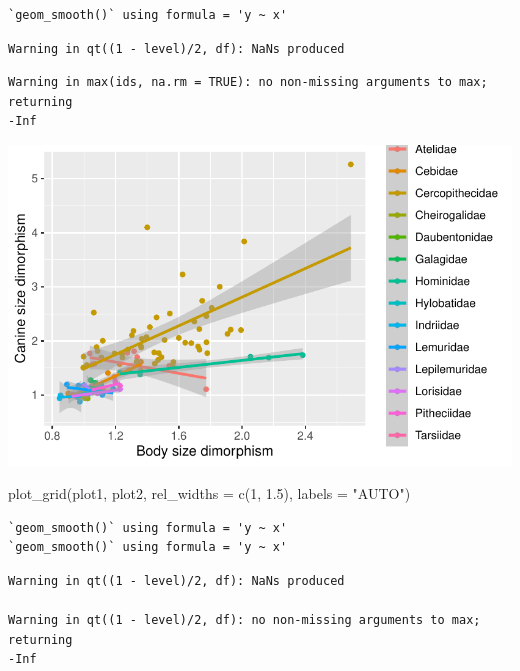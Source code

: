 \documentclass[
  letterpaper,
  DIV=11,
  numbers=noendperiod]{scrartcl}
\newenvironment{Shaded}{\begin{snugshade}}{\end{snugshade}}
\newcommand{\AttributeTok}[1]{\textcolor[rgb]{0.40,0.45,0.13}{#1}}
\newcommand{\DecValTok}[1]{\textcolor[rgb]{0.68,0.00,0.00}{#1}}
\newcommand{\FloatTok}[1]{\textcolor[rgb]{0.68,0.00,0.00}{#1}}
\newcommand{\FunctionTok}[1]{\textcolor[rgb]{0.28,0.35,0.67}{#1}}
\newcommand{\NormalTok}[1]{\textcolor[rgb]{0.00,0.23,0.31}{#1}}
\newcommand{\StringTok}[1]{\textcolor[rgb]{0.13,0.47,0.30}{#1}}
\begin{document}
\begin{verbatim}
`geom_smooth()` using formula = 'y ~ x'
\end{verbatim}

\begin{verbatim}
Warning in qt((1 - level)/2, df): NaNs produced
\end{verbatim}

\begin{verbatim}
Warning in max(ids, na.rm = TRUE): no non-missing arguments to max; returning
-Inf
\end{verbatim}

\includegraphics{EDA-challenge_files/figure-pdf/unnamed-chunk-5-2.pdf}

\begin{Shaded}
\begin{Highlighting}[]
\FunctionTok{plot\_grid}\NormalTok{(plot1, plot2, }\AttributeTok{rel\_widths =} \FunctionTok{c}\NormalTok{(}\DecValTok{1}\NormalTok{, }\FloatTok{1.5}\NormalTok{), }\AttributeTok{labels =} \StringTok{"AUTO"}\NormalTok{)}
\end{Highlighting}
\end{Shaded}

\begin{verbatim}
`geom_smooth()` using formula = 'y ~ x'
`geom_smooth()` using formula = 'y ~ x'
\end{verbatim}

\begin{verbatim}
Warning in qt((1 - level)/2, df): NaNs produced

Warning in qt((1 - level)/2, df): no non-missing arguments to max; returning
-Inf
\end{verbatim}
\end{document}
